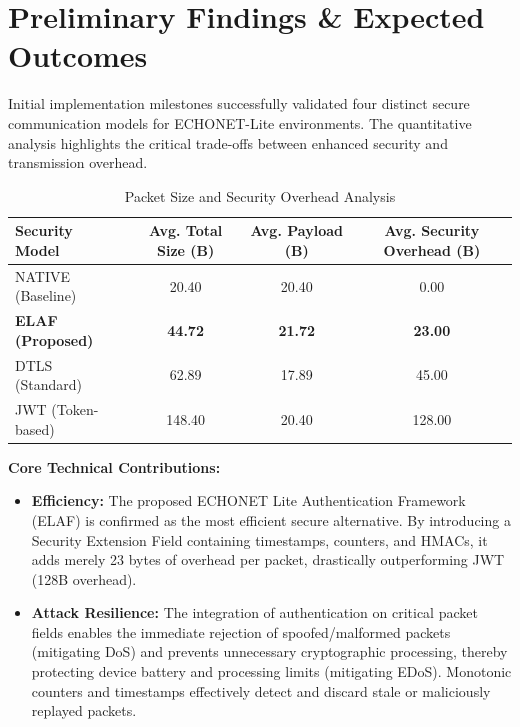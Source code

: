 \documentclass[11pt,a4paper]{article}
\begin{document}
\section{Preliminary Findings \& Expected Outcomes}
Initial implementation milestones successfully validated four distinct secure communication models for ECHONET-Lite environments. The quantitative analysis highlights the critical trade-offs between enhanced security and transmission overhead.

\begin{table}[htbp]
    \centering
    \caption{Packet Size and Security Overhead Analysis}
    \begin{tabular}{lccc}
        \toprule
        \textbf{Security Model} & \textbf{Avg. Total Size (B)} & \textbf{Avg. Payload (B)} & \textbf{Avg. Security Overhead (B)} \\
        \midrule
        NATIVE (Baseline) & 20.40 & 20.40 & 0.00 \\
        \textbf{ELAF (Proposed)} & \textbf{44.72} & \textbf{21.72} & \textbf{23.00} \\
        DTLS (Standard) & 62.89 & 17.89 & 45.00 \\
        JWT (Token-based) & 148.40 & 20.40 & 128.00 \\
        \bottomrule
    \end{tabular}
\end{table}

\vspace{0.5cm}
\noindent\textbf{Core Technical Contributions:}
\begin{itemize}
    \item \textbf{Efficiency:} The proposed ECHONET Lite Authentication Framework (ELAF) is confirmed as the most efficient secure alternative. By introducing a Security Extension Field containing timestamps, counters, and HMACs, it adds merely 23 bytes of overhead per packet, drastically outperforming JWT (128B overhead).
    \item \textbf{Attack Resilience:} The integration of authentication on critical packet fields enables the immediate rejection of spoofed/malformed packets (mitigating DoS) and prevents unnecessary cryptographic processing, thereby protecting device battery and processing limits (mitigating EDoS). Monotonic counters and timestamps effectively detect and discard stale or maliciously replayed packets.
\end{itemize}
\end{document}

